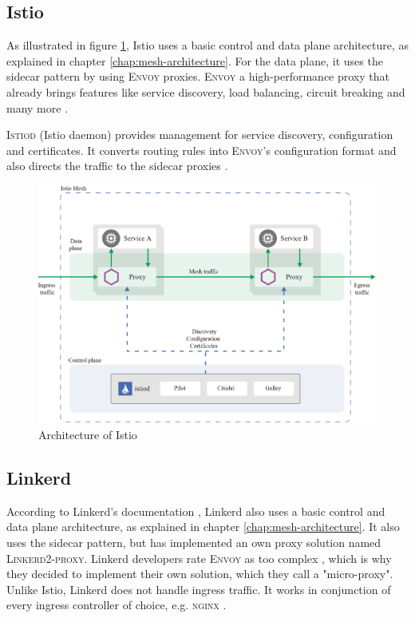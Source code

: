 \subsection{Istio}

As illustrated in figure \ref{fig:arch-istio}, Istio uses a basic control and data plane architecture, as explained in chapter \ref{chap:mesh-architecture}. For the data plane, it uses the sidecar pattern by using \textsc{Envoy} proxies. \textsc{Envoy} a high-performance proxy that already brings features like service discovery, load balancing, circuit breaking and many more \cite{istio-docs-arch}.

\textsc{Istiod} (Istio daemon) provides management for service discovery, configuration and certificates. It converts routing rules into \textsc{Envoy}'s configuration format and also directs the traffic to the sidecar proxies \cite{istio-docs-arch}.

\begin{figure}
    \includegraphics[width=\columnwidth]{img/istio_architecture.png}
    \caption{Architecture of Istio \cite{istio-docs-arch}}
    \label{fig:arch-istio}
\end{figure}

\subsection{Linkerd}

According to Linkerd's documentation \cite{linkerd-docs-arch}, Linkerd also uses a basic control and data plane architecture, as explained in chapter \ref{chap:mesh-architecture}. It also uses the sidecar pattern, but has implemented an own proxy solution named \textsc{Linkerd2-proxy}. Linkerd developers rate \textsc{Envoy} as too complex \cite{linkerd-docs-no-envoy}, which is why they decided to implement their own solution, which they call a "micro-proxy". 
Unlike Istio, Linkerd does not handle ingress traffic. It works in conjunction of every ingress controller of choice, e.g. \textsc{nginx} \cite{linkerd-docs-faq}.

